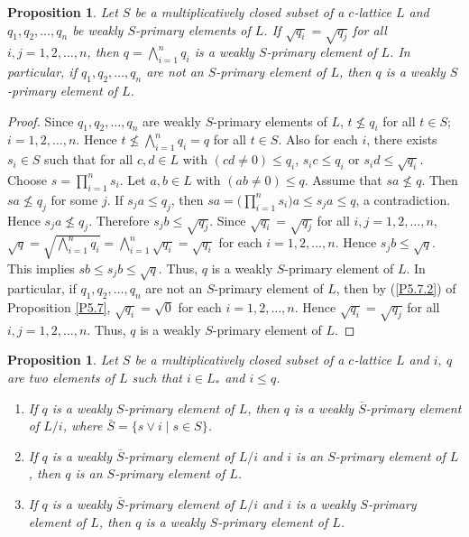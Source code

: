 \documentclass[10pt,twoside,a4paper]{amsart}
\numberwithin{equation}{section}
\theoremstyle{plain}
\newtheorem{prop}[lem]{Proposition}
\theoremstyle{definition}
\begin{document}
\begin{prop}
	Let $S$ be a multiplicatively closed subset of a $c$-lattice $L$ and $q_1,q_2,\dots,q_n$ be   weakly $S$-primary elements of $L$. If $\sqrt{q_i}=\sqrt{q_j}$ for all $i,j=1,2,\dots,n$, then $\displaystyle q=\bigwedge_{i=1}^{n}q_i$ is a weakly $S$-primary element of $L$. In particular, if $q_1,q_2,\dots,q_n$ are not an $S$-primary element of $L$, then  $q$ is a weakly $S$-primary element of $L$. 
\end{prop}
\begin{proof}
	Since $q_1,q_2,\dots,q_n$ are  weakly $S$-primary elements of $L$, $t\nleq q_i$ for all $t\in S$; $i=1,2,\dots,n$. Hence $\displaystyle t\nleq \bigwedge_{i=1}^{n}q_i=q$ for all $t\in S$. Also for each $i$, there exists $s_i\in S$ such that for all $c,d\in L$ with $ (cd \neq 0) \leq q_i$, $s_ic\leq q_i$ or $s_id\leq \sqrt{q_i}$. Choose $\displaystyle  s=\prod_{i=1}^{n}s_i$. Let $a,b\in L$ with $ (ab \neq 0)\leq q$. Assume that $sa\nleq q$. Then $sa\nleq q_j$ for some $j$. If $s_ja\leq q_j$, then $\displaystyle sa=\bigg(\prod_{i=1}^{n}s_i\bigg)a\leq s_ja\leq q$, a contradiction. Hence $s_ja\nleq q_j$. Therefore $s_jb\leq \sqrt{q_j}$. Since $\sqrt{q_i}=\sqrt{q_j}$ for all $i,j=1,2,\dots,n$, $\displaystyle \sqrt{q}=\sqrt{\bigwedge_{i=1}^{n}q_i}=\bigwedge_{i=1}^{n}\sqrt{q_i}=\sqrt{q_i}$ for each $i=1,2,\dots,n$. Hence $s_jb\leq \sqrt{q}$. This implies $sb\leq s_jb\leq \sqrt{q}$. Thus, $q$ is a weakly $S$-primary element of $L$. In particular, if $q_1,q_2,\dots,q_n$ are not an $S$-primary element of $L$, then by (\ref{P5.7.2}) of Proposition \ref{P5.7}, $\sqrt{q_i}=\sqrt{0}$ for each $i=1,2,\dots, n$. Hence $\sqrt{q_i}=\sqrt{q_j}$ for all $i,j=1,2,\dots,n$. Thus, $q$ is a weakly $S$-primary element of $L$.
\end{proof}


\begin{prop}
	Let $S$ be a multiplicatively closed subset of a $c$-lattice $L$ and $i,~q$ are two elements of $L$ such that $i \in L_*$ and $i \leq q$.
	
	\begin{enumerate}
		\item If $q$ is a weakly $S$-primary element of $L$, then $q$ is a weakly $\bar{S}$-primary element of $L/i$,  where $\bar{S} = \{s \vee i \;|\; s\in S\}$.
		
		\item If $q$ is a weakly $\bar{S}$-primary element of $L/i$ and $i$ is an $S$-primary element of $L$, then $q$ is an $S$-primary element of $L$.
		
		\item If $q$ is a weakly $\bar{S}$-primary element of $L/i$ and $i$ is a weakly  $S$-primary element of $L$, then $q$ is a weakly   $S$-primary element of $L$.
	\end{enumerate}
\end{prop}
\end{document}
